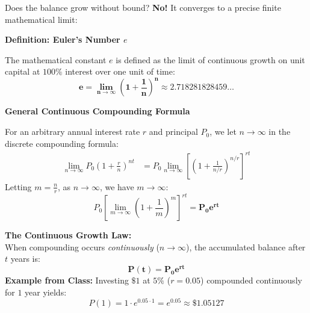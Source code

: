 \documentclass[10.5pt]{article}
\begin{document}
Does the balance grow without bound? \textbf{No!} It converges to a precise finite mathematical limit:

\begin{tcolorbox}[colback=chalkblue!6, colframe=chalkblue, boxrule=1pt, arc=3pt, left=8pt, right=8pt, top=4pt, bottom=4pt]
\textbf{\large Definition: Euler's Number $e$}
\vspace{1pt}

The mathematical constant $e$ is defined as the limit of continuous growth on unit capital at $100\%$ interest over one unit of time:
\[
  \mathbf{e = \lim_{n \to \infty} \left(1 + \frac{1}{n}\right)^n \approx 2.718281828459\dots}
\]
\end{tcolorbox}

\vspace{0.03in}

\textbf{\large General Continuous Compounding Formula}

For an arbitrary annual interest rate $r$ and principal $P_0$, we let $n \to \infty$ in the discrete compounding formula:
\begin{align*}
  \lim_{n \to \infty} P_0 \left(1 + \frac{r}{n}\right)^{nt} &= P_0 \lim_{n \to \infty} \left[\left(1 + \frac{1}{n/r}\right)^{n/r}\right]^{rt}
\end{align*}
Letting $m = \frac{n}{r}$, as $n \to \infty$, we have $m \to \infty$:
\[
  P_0 \left[\lim_{m \to \infty} \left(1 + \frac{1}{m}\right)^m\right]^{rt} = \mathbf{P_0 e^{rt}}
\]

\begin{tcolorbox}[colback=chalkgreen!6, colframe=chalkgreen, boxrule=1pt, arc=3pt, left=8pt, right=8pt, top=4pt, bottom=4pt]
\textbf{The Continuous Growth Law:}\\[2pt]
When compounding occurs \textit{continuously} ($n \to \infty$), the accumulated balance after $t$ years is:
\[
  \mathbf{P(t) = P_0 e^{rt}}
\]
\textbf{Example from Class:} Investing $\$1$ at $5\%$ ($r = 0.05$) compounded continuously for $1$ year yields:
\[
  P(1) = 1 \cdot e^{0.05 \cdot 1} = e^{0.05} \approx \mathbf{\$1.05127}
\]
\end{tcolorbox}
\end{document}
